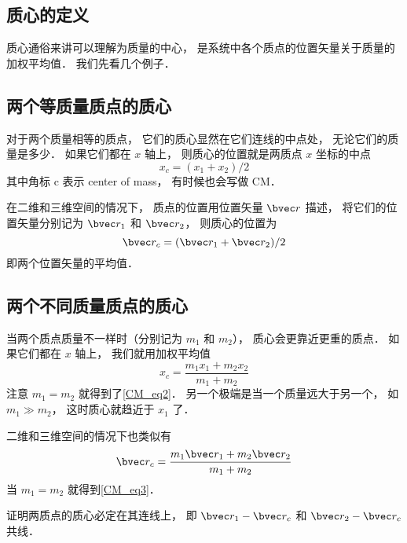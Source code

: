 

\subsection{质心的定义}
质心通俗来讲可以理解为质量的中心， 是系统中各个质点的位置矢量关于质量的加权平均值． 我们先看几个例子．

\subsection{两个等质量质点的质心}
对于两个质量相等的质点， 它们的质心显然在它们连线的中点处， 无论它们的质量是多少． 如果它们都在 $x$ 轴上， 则质心的位置就是两质点 $x$ 坐标的中点
\begin{equation}\label{CM_eq2}
x_c = (x_1 + x_2)/2
\end{equation}
其中角标 c 表示 center of mass， 有时候也会写做 CM．

在二维和三维空间的情况下， 质点的位置用位置矢量 $\bvec r$ 描述， 将它们的位置矢量分别记为 $\bvec r_1$ 和 $\bvec r_2$， 则质心的位置为
\begin{equation}\label{CM_eq3}
\bvec r_c = (\bvec r_1 + \bvec r_2)/2
\end{equation}
即两个位置矢量的平均值． %

\subsection{两个不同质量质点的质心}
当两个质点质量不一样时（分别记为 $m_1$ 和 $m_2$）， 质心会更靠近更重的质点． 如果它们都在 $x$ 轴上， 我们就用加权平均值
\begin{equation}
x_c = \frac{m_1 x_1 + m_2 x_2}{m_1 + m_2}
\end{equation}
注意 $m_1 = m_2$ 就得到了\autoref{CM_eq2}． 另一个极端是当一个质量远大于另一个， 如 $m_1 \gg m_2$， 这时质心就趋近于 $x_1$ 了．

二维和三维空间的情况下也类似有
\begin{equation}\label{CM_eq5}
\bvec r_c = \frac{m_1 \bvec r_1 + m_2 \bvec r_2}{m_1 + m_2}
\end{equation}
当 $m_1 = m_2$ 就得到\autoref{CM_eq3}．

\begin{exercise}{}
证明两质点的质心必定在其连线上， 即 $\bvec r_1 - \bvec r_c$ 和 $\bvec r_2 - \bvec r_c$ 共线．%
\end{exercise}

